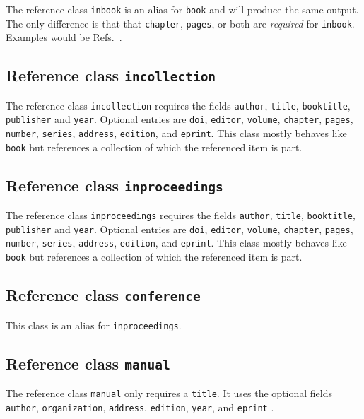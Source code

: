 \documentclass[a4paper,twocolumn,11pt]{quantumarticle}
\begin{document}
The reference class \texttt{inbook} is an alias for \texttt{book} and will produce the same output.
The only difference is that that \texttt{chapter}, \texttt{pages}, or both are \emph{required} for \texttt{inbook}.
Examples would be Refs.~.

\subsection{Reference class \texttt{incollection}}\label{sec:incollection}
The reference class \texttt{incollection} requires the fields \texttt{author}, \texttt{title}, \texttt{booktitle}, \texttt{publisher} and \texttt{year}.
Optional entries are \texttt{doi}, \texttt{editor}, \texttt{volume}, \texttt{chapter}, \texttt{pages}, \texttt{number}, \texttt{series}, \texttt{address}, \texttt{edition}, and \texttt{eprint}. This class mostly behaves like \texttt{book} but references a collection of which the referenced item is part.

\subsection{Reference class \texttt{inproceedings}}\label{sec:inproceedings}
The reference class \texttt{inproceedings} requires the fields \texttt{author}, \texttt{title}, \texttt{booktitle}, \texttt{publisher} and \texttt{year}.
Optional entries are \texttt{doi}, \texttt{editor}, \texttt{volume}, \texttt{chapter}, \texttt{pages}, \texttt{number}, \texttt{series}, \texttt{address}, \texttt{edition}, and \texttt{eprint}. This class mostly behaves like \texttt{book} but references a collection of which the referenced item is part.

\subsection{Reference class \texttt{conference}}\label{sec:conference}
This class is an alias for \texttt{inproceedings}.

\subsection{Reference class \texttt{manual}}\label{sec:manual}
The reference class \texttt{manual} only requires a \texttt{title}. It uses the optional fields \texttt{author}, \texttt{organization}, \texttt{address}, \texttt{edition}, \texttt{year}, and \texttt{eprint} .
\end{document}
